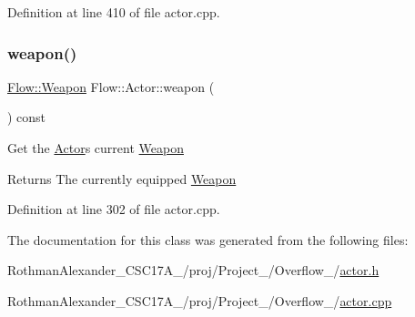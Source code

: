 Definition at line 410 of file actor.\+cpp.

\hypertarget{class_flow_1_1_actor_ad22b99397cfccf1b2e1f9022fd59a322}{}\label{class_flow_1_1_actor_ad22b99397cfccf1b2e1f9022fd59a322} 
\subsubsection{\texorpdfstring{weapon()}{weapon()}}
{\footnotesize\ttfamily \hyperlink{class_flow_1_1_weapon}{Flow\+::\+Weapon} Flow\+::\+Actor\+::weapon (\begin{DoxyParamCaption}{ }\end{DoxyParamCaption}) const}

Get the \hyperlink{class_flow_1_1_actor}{Actor}\textquotesingle{}s current \hyperlink{class_flow_1_1_weapon}{Weapon} \begin{DoxyReturn}{Returns}
The currently equipped \hyperlink{class_flow_1_1_weapon}{Weapon} 
\end{DoxyReturn}


Definition at line 302 of file actor.\+cpp.



The documentation for this class was generated from the following files\+:\begin{DoxyCompactItemize}
\item 
Rothman\+Alexander\+\_\+\+C\+S\+C17\+A\+\_/proj/\+Project\+\_/\+Overflow\+\_/\hyperlink{actor_8h}{actor.\+h}\item 
Rothman\+Alexander\+\_\+\+C\+S\+C17\+A\+\_/proj/\+Project\+\_/\+Overflow\+\_/\hyperlink{actor_8cpp}{actor.\+cpp}\end{DoxyCompactItemize}
